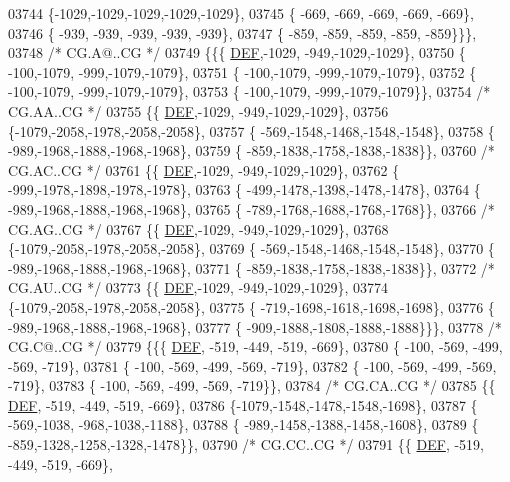 \begin{DoxyCode}
03744 \{-1029,-1029,-1029,-1029,-1029\},
03745 \{ -669, -669, -669, -669, -669\},
03746 \{ -939, -939, -939, -939, -939\},
03747 \{ -859, -859, -859, -859, -859\}\}\},
03748 \textcolor{comment}{/* CG.A@..CG */}
03749 \{\{\{  \mbox{\hyperlink{1_88_84__epars_8h_a397419fc12b37ed479c8abb9d444d843}{DEF}},-1029, -949,-1029,-1029\},
03750 \{ -100,-1079, -999,-1079,-1079\},
03751 \{ -100,-1079, -999,-1079,-1079\},
03752 \{ -100,-1079, -999,-1079,-1079\},
03753 \{ -100,-1079, -999,-1079,-1079\}\},
03754 \textcolor{comment}{/* CG.AA..CG */}
03755 \{\{  \mbox{\hyperlink{1_88_84__epars_8h_a397419fc12b37ed479c8abb9d444d843}{DEF}},-1029, -949,-1029,-1029\},
03756 \{-1079,-2058,-1978,-2058,-2058\},
03757 \{ -569,-1548,-1468,-1548,-1548\},
03758 \{ -989,-1968,-1888,-1968,-1968\},
03759 \{ -859,-1838,-1758,-1838,-1838\}\},
03760 \textcolor{comment}{/* CG.AC..CG */}
03761 \{\{  \mbox{\hyperlink{1_88_84__epars_8h_a397419fc12b37ed479c8abb9d444d843}{DEF}},-1029, -949,-1029,-1029\},
03762 \{ -999,-1978,-1898,-1978,-1978\},
03763 \{ -499,-1478,-1398,-1478,-1478\},
03764 \{ -989,-1968,-1888,-1968,-1968\},
03765 \{ -789,-1768,-1688,-1768,-1768\}\},
03766 \textcolor{comment}{/* CG.AG..CG */}
03767 \{\{  \mbox{\hyperlink{1_88_84__epars_8h_a397419fc12b37ed479c8abb9d444d843}{DEF}},-1029, -949,-1029,-1029\},
03768 \{-1079,-2058,-1978,-2058,-2058\},
03769 \{ -569,-1548,-1468,-1548,-1548\},
03770 \{ -989,-1968,-1888,-1968,-1968\},
03771 \{ -859,-1838,-1758,-1838,-1838\}\},
03772 \textcolor{comment}{/* CG.AU..CG */}
03773 \{\{  \mbox{\hyperlink{1_88_84__epars_8h_a397419fc12b37ed479c8abb9d444d843}{DEF}},-1029, -949,-1029,-1029\},
03774 \{-1079,-2058,-1978,-2058,-2058\},
03775 \{ -719,-1698,-1618,-1698,-1698\},
03776 \{ -989,-1968,-1888,-1968,-1968\},
03777 \{ -909,-1888,-1808,-1888,-1888\}\}\},
03778 \textcolor{comment}{/* CG.C@..CG */}
03779 \{\{\{  \mbox{\hyperlink{1_88_84__epars_8h_a397419fc12b37ed479c8abb9d444d843}{DEF}}, -519, -449, -519, -669\},
03780 \{ -100, -569, -499, -569, -719\},
03781 \{ -100, -569, -499, -569, -719\},
03782 \{ -100, -569, -499, -569, -719\},
03783 \{ -100, -569, -499, -569, -719\}\},
03784 \textcolor{comment}{/* CG.CA..CG */}
03785 \{\{  \mbox{\hyperlink{1_88_84__epars_8h_a397419fc12b37ed479c8abb9d444d843}{DEF}}, -519, -449, -519, -669\},
03786 \{-1079,-1548,-1478,-1548,-1698\},
03787 \{ -569,-1038, -968,-1038,-1188\},
03788 \{ -989,-1458,-1388,-1458,-1608\},
03789 \{ -859,-1328,-1258,-1328,-1478\}\},
03790 \textcolor{comment}{/* CG.CC..CG */}
03791 \{\{  \mbox{\hyperlink{1_88_84__epars_8h_a397419fc12b37ed479c8abb9d444d843}{DEF}}, -519, -449, -519, -669\},

\end{DoxyCode}
